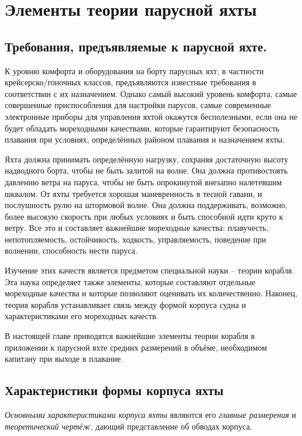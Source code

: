 \twocolumn

\chapter{Элементы теории парусной яхты}

\section{Требования, предъявляемые к парусной яхте.}

К уровню комфорта и оборудования на борту парусных яхт, в частности
крейсерско\-/гоночных классов, предъявляются известные требования в
соответствии с их назначением. Однако самый высокий уровень комфорта,
самые совершенные приспособления для настройки парусов, самые
современные электронные приборы для управления яхтой окажутся
бесполезными, если она не будет обладать мореходными качествами,
которые гарантируют безопасность плавания при условиях, определённых
районом плавания и назначением яхты.

Яхта должна принимать определённую нагрузку, сохраняя достаточную
высоту надводного борта, чтобы не быть залитой на волне. Она должна
противостоять давлению ветра на паруса, чтобы не быть опрокинутой
внезапно налетевшим шквалом. От яхты требуется хорошая маневренность в
тесной гавани, и послушность рулю на штормовой волне. Она должна
поддерживать, возможно, более высокую скорость при любых условиях и
быть способной идти круто к ветру. Все это и составляет важнейшие
мореходные качества: плавучесть, непотопляемость, остойчивость,
ходкость, управляемость, поведение при волнении, способность нести
паруса.

Изучение этих качеств является предметом специальной науки \--- теории
корабля. Эта наука определяет также элементы, которые составляют
отдельные мореходные качества и которые позволяют оценивать их
количественно. Наконец, теория корабля устанавливает связь между
формой корпуса судна и характеристиками его мореходных качеств.

В настоящей главе приводятся важнейшие элементы теории корабля в
приложении к парусной яхте средних размерений в объёме, необходимом
капитану при выходе в плавание.

\section{Характеристики формы корпуса яхты}

\textit{Основными характеристиками
корпуса яхты} являются его \textit{главные размерения}
и \textit{теоретический чертёж}, дающий
представление об обводах корпуса.

